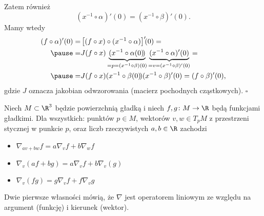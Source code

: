 \begin{frame}

Zatem również 
\[\left(x^{-1}\circ \alpha\right)'\!\!(0)=\left(x^{-1}\circ \beta\right)'\!\!(0).\] \pause Mamy wtedy
\begin{align*}
(f\circ \alpha)'(0)=&\left[(f\circ x)\circ (x^{-1}\circ \alpha)\right]'\!\!(0)=\\\pause
=& J(f\circ x)\underbrace{(x^{-1}\circ \alpha(0)\!)}_{=p=(x^{-1}\circ \beta)(0)}\underbrace{(x^{-1}\circ \alpha)'(0)}_{=v=(x^{-1}\circ \beta)'(0)}=\\\pause
=& J(f\circ x)(x^{-1}\circ \beta(0)\!)(x^{-1}\circ \beta)'(0)=(f\circ\beta)'(0),
\end{align*}
gdzie $J$ oznacza jakobian odwzorowania (macierz pochodnych cząstkowych).
\hfill $\square$

\end{frame}
\begin{frame}[<+->]

\begin{lemat}\label{lem:wl-pochodnej-kierunkowej}
Niech $M\subset \R^3$ będzie powierzchnią gładką i niech $f,g\colon M\to \R$ będą funkcjami gładkimi. Dla wszystkich: punktów $p\in M$, wektorów $v,w\in T_pM$ z przestrzeni stycznej w punkcie $p$, oraz liczb rzeczywistych $a,b\in \R$ zachodzi
\begin{itemize}
\item $\nabla_{av+bw}f=a\nabla_v f+b\nabla_w f$
\item $\nabla_v(af+bg)=a\nabla_v f+b\nabla_v(g)$
\item $\nabla_v(fg)=g\nabla_vf+f\nabla_vg$
\end{itemize}
\end{lemat}
\begin{uwaga}
Dwie pierwsze własności mówią, że $\nabla$ jest operatorem liniowym ze względu na argument (funkcję) i kierunek (wektor).
\end{uwaga}

\end{frame}
